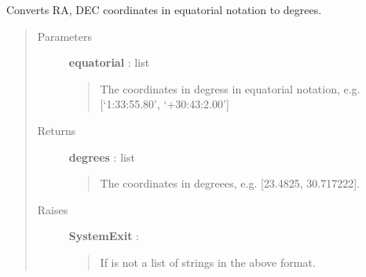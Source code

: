 \documentclass[a4paper,10pt,english]{sphinxmanual}
\begin{document}

\begin{fulllineitems}
\label{functions:astrolyze.functions.astro_functions.equatorial_to_degrees}
Converts RA, DEC coordinates in equatorial notation to degrees.
\begin{quote}\begin{description}
\item[{Parameters }] \leavevmode
\textbf{equatorial} : list
\begin{quote}

The coordinates in degress in equatorial notation, e.g.
{[}`1:33:55.80', `+30:43:2.00'{]}
\end{quote}

\item[{Returns }] \leavevmode
\textbf{degrees} : list
\begin{quote}

The coordinates in degreees, e.g. {[}23.4825, 30.717222{]}.
\end{quote}

\item[{Raises }] \leavevmode
\textbf{SystemExit} :
\begin{quote}

If  is not a list of strings in the above format.
\end{quote}

\end{description}\end{quote}

\end{fulllineitems}

\end{document}
